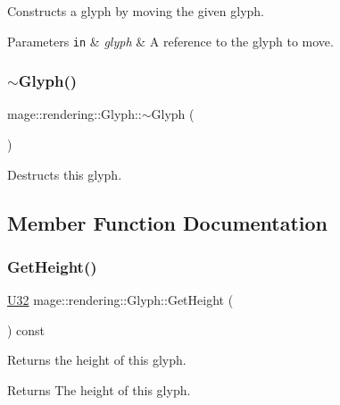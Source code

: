 Constructs a glyph by moving the given glyph.


\begin{DoxyParams}[1]{Parameters}
\mbox{\tt in}  & {\em glyph} & A reference to the glyph to move. \\
\hline
\end{DoxyParams}
\hypertarget{structmage_1_1rendering_1_1_glyph_a710f60d35f3af4ce978e2df974e4ea4c}{}\label{structmage_1_1rendering_1_1_glyph_a710f60d35f3af4ce978e2df974e4ea4c} 
\subsubsection{\texorpdfstring{$\sim$\+Glyph()}{~Glyph()}}
{\footnotesize\ttfamily mage\+::rendering\+::\+Glyph\+::$\sim$\+Glyph (\begin{DoxyParamCaption}{ }\end{DoxyParamCaption})\hspace{0.3cm}{\ttfamily [default]}}

Destructs this glyph. 

\subsection{Member Function Documentation}
\hypertarget{structmage_1_1rendering_1_1_glyph_a67acfad4c7fe409493ca82f75c0a266f}{}\label{structmage_1_1rendering_1_1_glyph_a67acfad4c7fe409493ca82f75c0a266f} 
\subsubsection{\texorpdfstring{Get\+Height()}{GetHeight()}}
{\footnotesize\ttfamily \hyperlink{namespacemage_a41c104c036fba3756a74e19f793eeaa1}{U32} mage\+::rendering\+::\+Glyph\+::\+Get\+Height (\begin{DoxyParamCaption}{ }\end{DoxyParamCaption}) const\hspace{0.3cm}{\ttfamily [noexcept]}}

Returns the height of this glyph.

\begin{DoxyReturn}{Returns}
The height of this glyph. 
\end{DoxyReturn}
\hypertarget{structmage_1_1rendering_1_1_glyph_a0c1f398017a59df8678d7d7f8ee6609e}{}\label{structmage_1_1rendering_1_1_glyph_a0c1f398017a59df8678d7d7f8ee6609e} 
